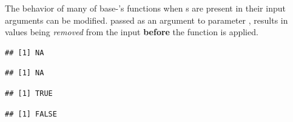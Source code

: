 \documentclass[krantz2]{krantz}\usepackage{knitr}
\begin{document}
The behavior of many of base-\Rlang's functions when s are present in their input arguments can be modified.  passed as an argument to parameter , results in  values being \emph{removed} from the input \textbf{before} the function is applied.

\begin{knitrout}\footnotesize
{}\color{fgcolor}\begin{kframe}
\begin{alltt}
 \hlopt{<} \hlstd{)}
\end{alltt}
\begin{verbatim}
## [1] NA
\end{verbatim}
\begin{alltt}
 \hlopt{>} \hlstd{)}
\end{alltt}
\begin{verbatim}
## [1] NA
\end{verbatim}
\begin{alltt}
 \hlopt{<} \hlstd{,} \hlstd{=}\hlstd{)}
\end{alltt}
\begin{verbatim}
## [1] TRUE
\end{verbatim}
\begin{alltt}
 \hlopt{>} \hlstd{,} \hlstd{=}\hlstd{)}
\end{alltt}
\begin{verbatim}
## [1] FALSE
\end{verbatim}
\end{kframe}
\end{knitrout}
\end{document}
